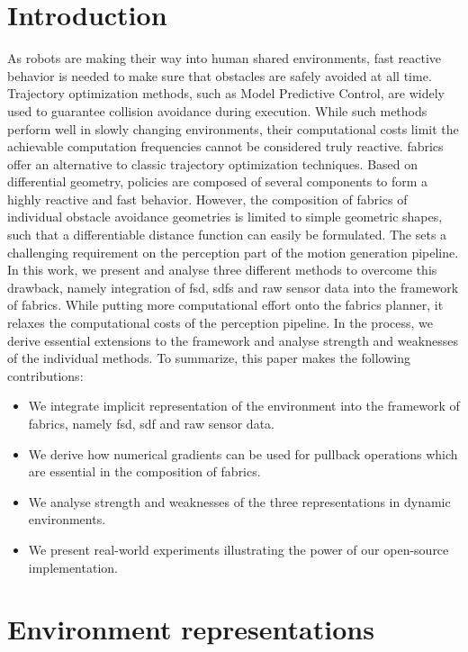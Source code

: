 \section{Introduction}
\label{sec:ral24_intro}


As robots are making their way into human shared environments,
fast reactive behavior is needed to make sure that obstacles are safely avoided
at all time. Trajectory optimization methods, such as Model Predictive Control,
are widely used to guarantee collision avoidance during execution. While such
methods perform well in slowly changing environments, their computational costs
limit the achievable computation frequencies cannot be considered truly reactive. 
\ac{fabrics} offer an
alternative to classic trajectory optimization techniques. Based on differential
geometry, policies are composed of several components to form a highly reactive
and fast behavior. However, the composition of \ac{fabrics} of
individual obstacle avoidance geometries is limited to simple geometric shapes,
such that a differentiable distance function can easily be formulated. The 
sets a challenging requirement on the perception part of the motion generation
pipeline. In this work, we present and analyse three different methods to 
overcome this drawback, namely integration of \ac{fsd}, 
\acp{sdf} and raw sensor data into the framework of
\ac{fabrics}. While putting more computational effort onto the fabrics planner, it
relaxes the computational costs of the perception pipeline.
In the process, we derive essential extensions to the framework and
analyse strength and weaknesses of the individual methods. To summarize, this
paper makes the following contributions:
\begin{itemize}
  \item We integrate implicit representation of the environment into the
    framework of \ac{fabrics}, namely \ac{fsd}, \ac{sdf}
    and raw sensor data.
  \item We derive how numerical gradients can be used for pullback operations
    which are essential in the composition of \ac{fabrics}.
  \item We analyse strength and weaknesses of the three representations in
    dynamic environments.
  \item We present real-world experiments illustrating the power of our
    open-source implementation.
\end{itemize}

\section{Environment representations}
\label{sec:environment_representations}

